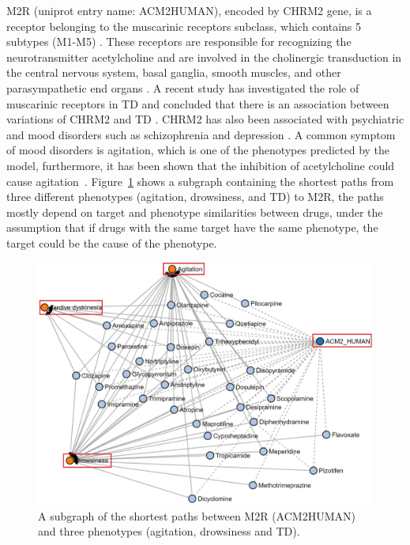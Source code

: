 M2R (uniprot entry name: ACM2\textunderscore HUMAN), encoded by CHRM2 gene, is a receptor belonging to the muscarinic receptors subclass, which contains 5 subtypes (M1-M5) \cite{kleinz_chapter_2008}.
These receptors are responsible for recognizing the neurotransmitter acetylcholine and are involved in the cholinergic transduction in the central nervous system, basal ganglia, smooth muscles, and other parasympathetic end organs \cite{aronstam_muscarinic_2009}.
A recent study has investigated the role of muscarinic receptors in \ac{TD} and concluded that there is an association between variations of CHRM2 and \ac{TD} \cite{boiko_pharmacogenetics_2019}.
CHRM2 has also been associated with psychiatric and mood disorders such as schizophrenia and depression \cite{drevets_antidepressant_2013, jeon_role_2015, dean_possible_2015}.
A common symptom of mood disorders is agitation, which is one of the phenotypes predicted by the model, furthermore, it has been shown that the inhibition of acetylcholine could cause agitation~\cite{carlson_physiology_2019}.
Figure~\ref{fig:chrm2_phenotypes} shows a subgraph containing the shortest paths from three different phenotypes (agitation, drowsiness, and \ac{TD}) to M2R, the paths mostly depend on target and phenotype similarities between drugs, under the assumption that if drugs with the same target have the same phenotype, the target could be the cause of the phenotype.

\begin{figure}[h!]
    \centering
    \includegraphics[scale=0.6]
    {figures/chrm2_phenotypes.jpg}
    \caption{\label{fig:chrm2_phenotypes} A subgraph of the shortest paths between M2R (ACM2\textunderscore HUMAN) and three phenotypes (agitation, drowsiness and TD).}
\end{figure}


